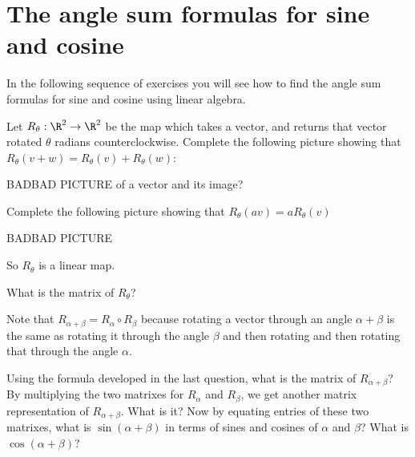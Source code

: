 
\section{The angle sum formulas for sine and cosine}

In the following sequence of exercises you will see how to find the angle sum formulas for sine and cosine using linear algebra.


\begin{question}
	Let $R_\theta : \R^2 \to \R^2$ be the map which takes a vector, and returns that vector rotated $\theta$ radians counterclockwise.
	Complete the following picture showing that $R_\theta(v+w) = R_\theta(v)+R_\theta(w)$:
	
	BADBAD PICTURE of a vector and its image?
	
	Complete the following picture showing that $R_\theta(av) = aR_\theta(v)$
	
	BADBAD PICTURE
\end{question}

	So $R_\theta$ is a linear map.
	
	\begin{question}
		What is the matrix of $R_\theta$?
	\end{question}
	
	Note that $R_{\alpha+\beta} = R_{\alpha} \circ R_{\beta}$ because rotating a vector through an angle $\alpha +\beta$
	 is the same as rotating it through the angle $\beta$ and then rotating and then rotating that through the angle $\alpha$.
	 
	 \begin{question}
	 	Using the formula developed in the last question, what is the matrix of $R_{\alpha+\beta}$?
	 	By multiplying the two matrixes for $R_\alpha$ and $R_\beta$, we get another matrix representation of $R_{\alpha +\beta}$.  What is it?
	 	Now by equating entries of these two matrixes, what is $\sin(\alpha+\beta)$ in terms of sines and cosines of $\alpha$ and $\beta$?
	 	What is $\cos(\alpha+\beta)$?
	 \end{question}

